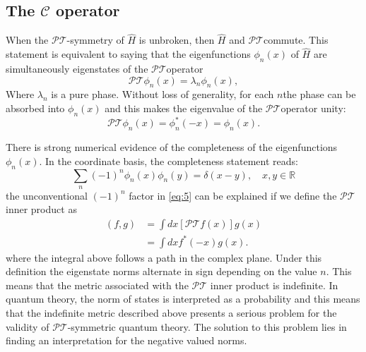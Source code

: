 \documentclass[12pt, a4paper]{report}
\newcommand\PT{\(\mathcal{PT}\)}
\begin{document}
\subsection{The $\mathcal{C}$ operator}\label{CC}
When the \PT-symmetry of $\hat{H}$ is unbroken, then $\hat{H}$ and \PT\:commute. This statement is equivalent to saying that the eigenfunctions $\phi_n(x)$ of $\hat{H}$ are simultaneously eigenstates of the \PT\:operator\cite{Bender_2004}
\begin{equation}\label{eq:1.4}
\mathcal{PT}\phi_n(x) = \lambda_n \phi_n(x),
\end{equation}
Where $\lambda_n$ is a pure phase. Without loss of generality, for each $n$\:the phase can be absorbed into $\phi_n(x)$ and this makes the eigenvalue of the \PT operator unity\cite{Bender_2004}: 
\begin{equation}\label{eq:1.5}
\mathcal{PT}\phi_n(x) = \phi_{n}^{*}(-x) = \phi_n(x).
\end{equation}

There is strong numerical evidence of the completeness of the eigenfunctions $\phi_n(x)$\cite{ComplexExtension}\cite{Bender_2004}\cite{Brody_2013}. In the coordinate basis, the completeness statement reads:
\begin{equation}\label{eq:1.6}
\sum_{n}(-1)^{n}\phi_n(x)\phi_n(y) = \delta(x-y),\quad x, y \in \mathbb{R}
\end{equation}
the unconventional $(-1)^n$ factor in \ref{eq:5} can be explained if we define the \PT\:inner product as
\begin{align}\label{eq:1.7}
\left ( f, g \right )  & = \int dx \left [ \mathcal{PT} f(x) \right ] g(x)\nonumber\\
                       & = \int dx f^{*}(-x) g(x).
\end{align}
where the integral above follows a path in the complex plane. Under this definition the eigenstate norms alternate in sign depending on the value $n$. This means that the metric associated with the \PT\: inner product is indefinite\cite{Bender_2004}\cite{Critique}.
In quantum theory, the norm of states is interpreted as a probability and this means that the indefinite metric described above presents a serious problem for the validity of \PT-symmetric quantum theory. The solution to this problem lies in finding an interpretation for
the negative valued norms\cite{PT-symmetricQM}.
\end{document}
